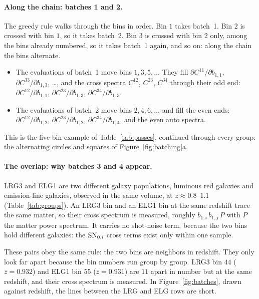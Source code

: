 \documentclass[11pt]{article}
\newcommand{\SNzi}{{\rm SN}_{0,i}}
\begin{document}
\paragraph{Along the chain: batches 1 and 2.}
The greedy rule walks through the bins in order.  Bin $1$ takes
batch~1.  Bin $2$ is crossed with bin $1$, so it takes batch~2.  Bin $3$
is crossed with bin $2$ only, among the bins already numbered, so it
takes batch~1 again, and so on: along the chain the bins alternate.
\begin{itemize}
  \item The evaluations of batch~1 move bins $1, 3, 5, \ldots$  They
    fill $\partial C^{11}/\partial b_{1,1}$,
    $\partial C^{33}/\partial b_{1,3}$, \ldots, and the cross spectra
    $C^{12}$, $C^{23}$, $C^{34}$ through their odd end:
    $\partial C^{12}/\partial b_{1,1}$, $\partial C^{23}/\partial b_{1,3}$,
    $\partial C^{34}/\partial b_{1,3}$.
  \item The evaluations of batch~2 move bins $2, 4, 6, \ldots$ and fill
    the even ends: $\partial C^{12}/\partial b_{1,2}$,
    $\partial C^{23}/\partial b_{1,2}$, $\partial C^{34}/\partial b_{1,4}$,
    and the even auto spectra.
\end{itemize}
This is the five-bin example of Table~\ref{tab:passes}, continued
through every group: the alternating circles and squares of
Figure~\ref{fig:batching}a.

\paragraph{The overlap: why batches 3 and 4 appear.}
LRG3 and ELG1 are two different galaxy populations, luminous red
galaxies and emission-line galaxies, observed in the same volume, at
$z \approx 0.8$--$1.1$ (Table~\ref{tab:groups}).  An LRG3 bin and an
ELG1 bin at the same redshift trace the same matter, so their cross
spectrum is measured, roughly $b_{1,i}\,b_{1,j}\,P$ with $P$ the matter
power spectrum.  It carries no shot-noise term, because the two bins
hold different galaxies: the $\SNzi$ cross terms exist only within one
sample.

These pairs obey the same rule: the two bins are neighbors in redshift.
They only look far apart because the bin numbers run group by group.
LRG3 bin $44$ ($\bar{z} = 0.932$) and ELG1 bin $55$ ($\bar{z} = 0.931$)
are $11$ apart in number but at the same redshift, and their cross
spectrum is measured.  In Figure~\ref{fig:batches}, drawn against
redshift, the lines between the LRG and ELG rows are short.
\end{document}
